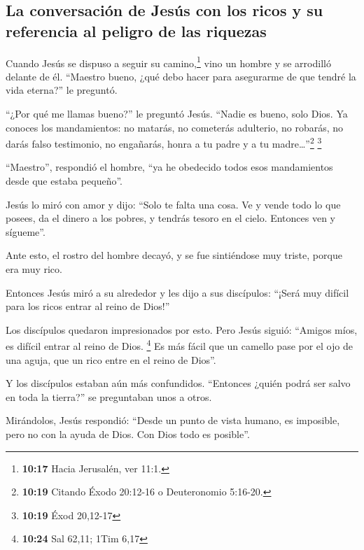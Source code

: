 \hypertarget{la-conversaciuxf3n-de-jesuxfas-con-los-ricos-y-su-referencia-al-peligro-de-las-riquezas}{%
\subsection{La conversación de Jesús con los ricos y su referencia al
peligro de las
riquezas}\label{la-conversaciuxf3n-de-jesuxfas-con-los-ricos-y-su-referencia-al-peligro-de-las-riquezas}}

 Cuando Jesús se dispuso a seguir su camino,\footnote{\textbf{10:17}
  Hacia Jerusalén, ver 11:1.} vino un hombre y se arrodilló delante de
él. ``Maestro bueno, ¿qué debo hacer para asegurarme de que tendré la
vida eterna?'' le preguntó.

 ``¿Por qué me llamas bueno?'' le preguntó Jesús. ``Nadie
es bueno, solo Dios.  Ya conoces los mandamientos: no
matarás, no cometerás adulterio, no robarás, no darás falso testimonio,
no engañarás, honra a tu padre y a tu madre\ldots{}''\footnote{\textbf{10:19}
  Citando Éxodo 20:12-16 o Deuteronomio 5:16-20.} \footnote{\textbf{10:19}
  Éxod 20,12-17}

 ``Maestro'', respondió el hombre, ``ya he obedecido
todos esos mandamientos desde que estaba pequeño''.

 Jesús lo miró con amor y dijo: ``Solo te falta una cosa.
Ve y vende todo lo que posees, da el dinero a los pobres, y tendrás
tesoro en el cielo. Entonces ven y sígueme''.

 Ante esto, el rostro del hombre decayó, y se fue
sintiéndose muy triste, porque era muy rico.

 Entonces Jesús miró a su alrededor y les dijo a sus
discípulos: ``¡Será muy difícil para los ricos entrar al reino de
Dios!''

 Los discípulos quedaron impresionados por esto. Pero
Jesús siguió: ``Amigos míos, es difícil entrar al reino de Dios.
\footnote{\textbf{10:24} Sal 62,11; 1Tim 6,17}  Es más
fácil que un camello pase por el ojo de una aguja, que un rico entre en
el reino de Dios''.

 Y los discípulos estaban aún más confundidos. ``Entonces
¿quién podrá ser salvo en toda la tierra?'' se preguntaban unos a otros.

 Mirándolos, Jesús respondió: ``Desde un punto de vista
humano, es imposible, pero no con la ayuda de Dios. Con Dios todo es
posible''.

